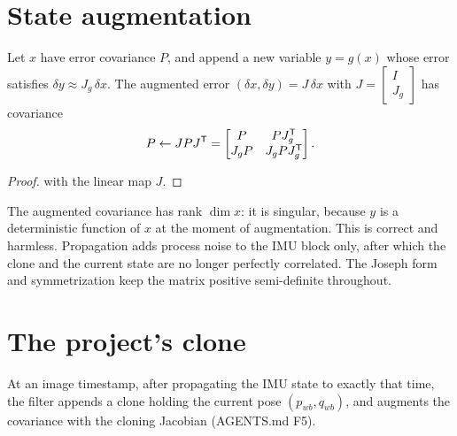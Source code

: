 \section{State augmentation}

\begin{proposition}
\label{prop:augmentation}
Let $x$ have error covariance $P$, and append a new variable $y = g(x)$ whose error satisfies $\delta y \approx J_g\,\delta x$. The
augmented error $(\delta x, \delta y) = J\,\delta x$ with $J = \begin{bmatrix} I \\ J_g\end{bmatrix}$ has covariance
\begin{equation}
  P \gets J P J^{\mathsf{T}} = \begin{bmatrix} P & PJ_g^{\mathsf{T}} \\ J_gP & J_gPJ_g^{\mathsf{T}} \end{bmatrix}.
  \label{eq:augmentation}
\end{equation}
\end{proposition}
\begin{proof}
 with the linear map $J$.
\end{proof}

The augmented covariance has rank $\dim x$: it is singular, because $y$ is a deterministic function of $x$ at the moment of
augmentation. This is correct and harmless. Propagation adds process noise to the IMU block only, after which the clone and
the current state are no longer perfectly correlated. The Joseph form and symmetrization keep the matrix positive
semi-definite throughout.

\section{The project's clone}

At an image timestamp, after propagating the IMU state to exactly that time, the filter appends a clone holding the current
pose $(p_{wb}, q_{wb})$, and augments the covariance with the cloning Jacobian (AGENTS.md F5).


